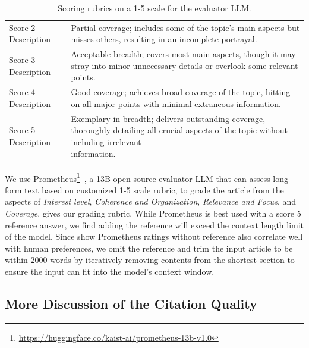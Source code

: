 \begin{table}
{\begin{tabular}{ll}
Score 2 Description  & Partial coverage; includes some of the topic's main aspects but misses others, resulting in an incomplete portrayal.                                                                      \\
Score 3 Description  & Acceptable breadth; covers most main aspects, though it may stray into minor unnecessary details or overlook some relevant points.                                                        \\
Score 4 Description  & Good coverage; achieves broad coverage of the topic, hitting on all major points with minimal extraneous information.                                                                     \\
Score 5 Description  & \makecell[l]{Exemplary in breadth; delivers outstanding coverage, thoroughly detailing all crucial aspects of the topic without including irrelevant \\information.}                                      \\
\bottomrule
\end{tabular}
}
\caption{Scoring rubrics on a 1-5 scale for the evaluator LLM.}
\label{table:rubric}
\end{table}


We use Prometheus\footnote{\url{https://huggingface.co/kaist-ai/prometheus-13b-v1.0}}~\citep{kim2023prometheus}, a 13B open-source evaluator LLM that can assess long-form text based on customized 1-5 scale rubric, to grade the article from the aspects of \textit{Interest level}, \textit{Coherence and Organization}, \textit{Relevance and Focus}, and \textit{Coverage}.  gives our grading rubric. While Prometheus is best used with a score 5 reference answer, we find adding the reference will exceed the context length limit of the model. Since \citet{kim2023prometheus} show Prometheus ratings without reference also correlate well with human preferences, we omit the reference and trim the input article to be within 2000 words by iteratively removing contents from the shortest section to ensure the input can fit into the model's context window.

\subsection{More Discussion of the Citation Quality}
\label{appendix:citation_quality_discuss}

